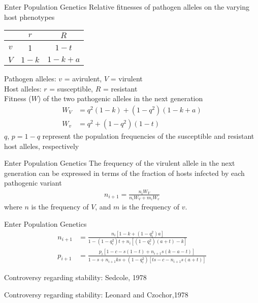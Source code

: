 \documentclass[presentation]{beamer}
\begin{document}
\begin{frame}{Enter Population Genetics}
Relative fitnesses of pathogen alleles on the varying host phenotypes
\begin{center}
\begin{tabular}{c|c|c}
& \textbf{$r$} & \textbf{$R$}\\
\hline
$v$ & 1 & $1-t$\\
$V$ & $1-k$ & $1-k+a$\\
\end{tabular}
\end{center}
Pathogen alleles: $v$ = avirulent, $V$ = virulent \\
Host alleles: $r$ = susceptible, $R$ = resistant \\
\pause
Fitness ($W$) of the two pathogenic alleles in the next generation
\begin{align}
W_V&=q^2(1-k)+(1-q^2)(1-k+a) \label{eq:fitV} \\
W_v&=q^2 + (1-q^2)(1-t) \label{eq:fitv}
\end{align}
$q$, $p=1-q$ represent the population frequencies of the susceptible and resistant host alleles, respectively
\end{frame}
\begin{frame}{Enter Population Genetics}
The frequency of the virulent allele in the next generation can be expressed in terms of the fraction of hosts infected by each pathogenic variant
\begin{align*}
n_{i+1}=\frac{n_iW_V}{n_iW_V+m_iW_v}
\end{align*}
where $n$ is the frequency of $V$, and $m$ is the frequency of $v$.
\end{frame}
\begin{frame}[label=PathogenDerivation]{Enter Population Genetics}
\begin{align}
n_{i+1} &= \frac{n_i[1-k+(1-q_i^2)a]}{1-(1-q_i^2)t+n_i[(1-q_i^2)(a+t)-k]} \label{eq:Leonard94-1} \\
p_{i+1} &= \frac{p_i[1-c-s(1-t)+n_{i+1}s(k-a-t)]}{1-s+n_{i+1}ks+(1-q_i^2)[ts-c-n_{i+1}s(a+t)]} \label{eq:Leonard94-2}
\end{align}
\vfill{}
\hyperlink{HostDerivation}{}
\end{frame}
\begin{frame}[label=sec-3]{Controversy regarding stability: Sedcole, 1978}
\end{frame}
\begin{frame}[label=sec-4]{Controversy regarding stability: Leonard and Czochor,1978}
\end{frame}
\end{document}
